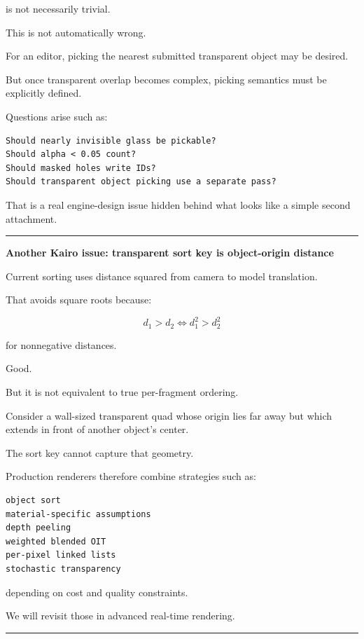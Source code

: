 is not necessarily trivial.

This is not automatically wrong.

For an editor, picking the nearest submitted transparent object may be desired.

But once transparent overlap becomes complex, picking semantics must be explicitly defined.

Questions arise such as:

\begin{verbatim}
Should nearly invisible glass be pickable?
Should alpha < 0.05 count?
Should masked holes write IDs?
Should transparent object picking use a separate pass?
\end{verbatim}

That is a real engine-design issue hidden behind what looks like a simple second attachment.

\begin{center}\rule{0.5\linewidth}{0.5pt}\end{center}

\textbf{Another Kairo issue: transparent sort key is object-origin distance}

Current sorting uses distance squared from camera to model translation.

That avoids square roots because:

\[
d_1>d_2
\iff
d_1^2>d_2^2
\]

for nonnegative distances.

Good.

But it is not equivalent to true per-fragment ordering.

Consider a wall-sized transparent quad whose origin lies far away but which extends in front of another object's center.

The sort key cannot capture that geometry.

Production renderers therefore combine strategies such as:

\begin{verbatim}
object sort
material-specific assumptions
depth peeling
weighted blended OIT
per-pixel linked lists
stochastic transparency
\end{verbatim}

depending on cost and quality constraints.

We will revisit those in advanced real-time rendering.

\begin{center}\rule{0.5\linewidth}{0.5pt}\end{center}

